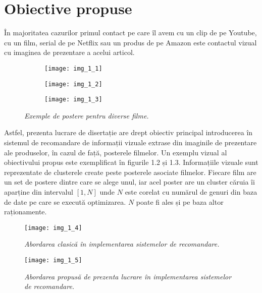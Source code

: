 \section{Obiective propuse}
În majoritatea cazurilor primul contact pe care îl avem cu un clip de pe Youtube, cu un film, serial de pe Netflix sau un produs de pe Amazon este contactul vizual cu imaginea de prezentare a acelui articol. 
\begin{figure}[!h]
  \begin{subfigure}[b]{0.3\textwidth}
    \texttt{[image: img\_1\_1]}
  \end{subfigure}
  \hfill
  \begin{subfigure}[b]{0.3\textwidth}
    \texttt{[image: img\_1\_2]}
  \end{subfigure}
  \hfill
  \begin{subfigure}[b]{0.3\textwidth}
    \texttt{[image: img\_1\_3]}
  \end{subfigure}
  \caption[Exemple de postere]{\textit{Exemple de postere pentru diverse filme.}}
\end{figure}


Astfel, prezenta lucrare de disertație are drept obiectiv principal introducerea în sistemul de recomandare de informații vizuale extrase din imaginile de prezentare ale produselor, în cazul de față, posterele filmelor. Un exemplu vizual al obiectivului propus este exemplificat în figurile 1.2 și 1.3. Informațiile vizuale sunt reprezentate de clusterele create peste posterele asociate filmelor. Fiecare film are un set de postere dintre care se alege unul, iar acel poster are un cluster căruia îi aparține din intervalul $[1, N]$ unde $N$ este corelat cu numărul de genuri din baza de date pe care se execută optimizarea. $N$ poate fi ales și pe baza altor raționamente.
\begin{figure}[!h]
	\centering
	\texttt{[image: img\_1\_4]}
	\caption[Abordarea clasică în implementarea sistemelor de recomandare]{\textit{Abordarea clasică în implementarea sistemelor de recomandare.}}
\end{figure} 
\begin{figure}[!h]
	\centering
	\texttt{[image: img\_1\_5]}
	\caption[Abordarea propusă de prezenta lucrare în implementarea sistemelor de recomandare]{\textit{Abordarea propusă de prezenta lucrare în implementarea sistemelor de recomandare.}}
\end{figure}

